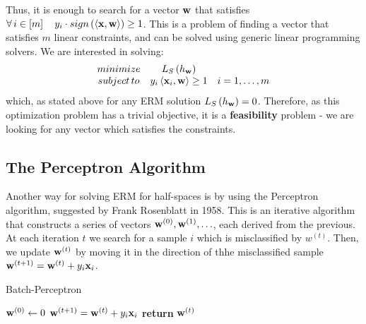 Thus, it is enough to search for a vector $\mathbf{w}$ that satisfies $\forall\, i\in\left[m\right]\quad y_i\cdot sign\left(\left\langle \mathbf{x},\mathbf{w}\right\rangle\right)\geq 1$. This is a problem of finding a vector that satisfies $m$ linear constraints, and can be solved using generic linear programming solvers. We are interested in solving:
\begin{equation}
\begin{array}{ccc}
minimize & L_S\left(h_{\mathbf{w}}\right) & \\
subject \, to & y_i\left\langle \mathbf{x}_i,\mathbf{w}\right\rangle\geq 1 & i=1,\ldots,m\\
\end{array}
\label{eqn:half_space_opt}
\end{equation}
which, as stated above for any ERM solution $L_S\left(h_{\mathbf{w}}\right)=0$. Therefore, as this optimization problem has a trivial objective, it is a \textbf{feasibility} problem - we are looking for any vector which satisfies the constraints.


\subsection{The Perceptron Algorithm}
Another way for solving ERM for half-spaces is by using the Perceptron algorithm, suggested by Frank Rosenblatt in 1958. This is an iterative algorithm that constructs a series of vectors $\mathbf{w}^{\left(0\right)},\mathbf{w}^{\left(1\right)},\ldots$, each derived from the previous. At each iteration $t$ we search for a sample $i$ which is misclassified by $w^{\left(t\right)}$. Then, we update $\mathbf{w}^{\left(t\right)}$ by moving it in the direction of thhe misclassified sample $\mathbf{w}^{\left(t+1\right)}=\mathbf{w}^{\left(t\right)} + y_i\mathbf{x}_i$. 
\begin{algorithm}
	\caption{Batch-Perceptron}\label{batch_perceptron}
	\begin{algorithmic}
		\State $\mathbf{w}^{\left(0\right)} \gets 0$ 
		\State $\mathbf{w}^{\left(t+1\right)}=\mathbf{w}^{\left(t\right)}+y_i\mathbf{x}_i$
		\Else
		\State \textbf{return} $\mathbf{w}^{\left(t\right)}$
		\EndIf
		\EndFor
		\EndProcedure
	\end{algorithmic}
\end{algorithm}




